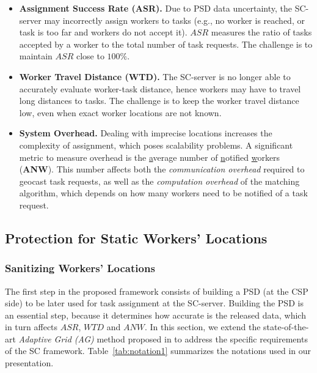 \documentclass{USC-Thesis}
\renewcommand\bf\bfseries  %
\numberwithin{equation}{chapter}
\begin{document}
\begin{itemize}
\item
{\bf Assignment Success Rate (ASR).} Due to PSD data uncertainty, the SC-server may incorrectly assign workers to tasks (e.g., no worker is reached, or task is too far and workers do not accept it). $\mathit{ASR}$ measures the ratio of tasks accepted by a worker
to the total number of task requests. The challenge is to maintain $\mathit{ASR}$ close to $100\%$.
\item
{\bf Worker Travel Distance (WTD).} The SC-server is no longer able to accurately evaluate worker-task distance, hence workers may have to travel long distances to tasks. The challenge is to keep the worker travel distance low, even when exact worker locations are not known.
\item
{\bf System Overhead.} Dealing with imprecise locations increases the complexity of assignment, which poses scalability problems. 
A significant metric to measure overhead is the {\underline a}verage number of {\underline n}otified {\underline w}orkers ({\bf ANW}).
This number affects both the {\em communication overhead} required to geocast task requests, as well as the {\em computation overhead} of the matching algorithm, which depends on how many workers need to be notified of a task request.
\end{itemize}

\subsection{Protection for Static Workers' Locations}
\subsubsection{Sanitizing Workers' Locations}
\label{sec:psd}

The first step in the proposed framework consists of building a PSD (at the CSP side) to be later used for task assignment at the SC-server. Building the PSD is an essential step, because it determines how accurate is the released data, which in turn affects $\mathit{ASR}$, $\mathit{WTD}$ and $\mathit{ANW}$. 
In this section, we extend the state-of-the-art {\em Adaptive Grid (AG)} method proposed in \cite{qardaji2012differentially} to address the specific requirements of the SC framework.
Table~\ref{tab:notation1} summarizes the notations used in our presentation.
\end{document}
